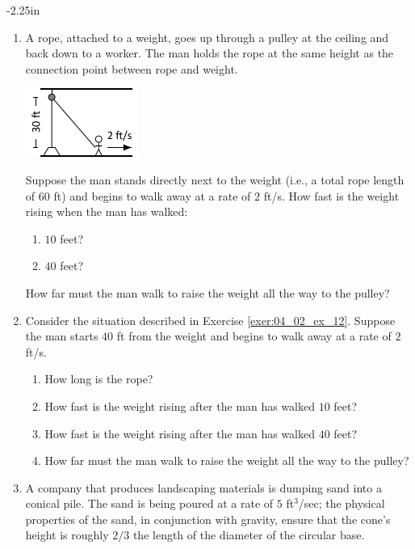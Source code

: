 \clearpage

\begin{adjustwidth*}{}{-2.25in}
\setlength{\columnsep}{25pt}
\begin{multicols*}{2}\small

\begin{enumerate}[1),start=12]

\item \label{exer:04_02_ex_12}A rope, attached to a weight, goes up through a pulley at the ceiling and back down to a worker. The man holds the rope at the same height as the connection point between rope and weight.

\includegraphics[scale=1.25]{figures/fig04_02_ex_12}

Suppose the man stands directly next to the weight (i.e., a total rope length of $60$ ft) and begins to walk away at a rate of $2$ ft/s. How fast is the weight rising when the man has walked:
\begin{enumerate}
\item	$10$ feet?
\item	$40$ feet?
\end{enumerate}
How far must the man walk to raise the weight all the way to the pulley?

\item Consider the situation described in Exercise \ref{exer:04_02_ex_12}. Suppose the man starts $40$ ft from the weight and begins to walk away at a rate of $2$ ft/s. 
\begin{enumerate}
\item	How long is the rope?
\item	How fast is the weight rising after the man has walked $10$ feet?
\item	How fast is the weight rising after the man has walked $40$ feet?
\item	How far must the man walk to raise the weight all the way to the pulley?
\end{enumerate}

\item A company that produces landscaping materials is dumping sand into a conical pile. The sand is being poured at a rate of $5$ ft$^3$/sec; the physical properties of the sand, in conjunction with gravity, ensure that the cone's height is roughly $2/3$ the length of the diameter of the circular base. 


\end{enumerate}
\end{multicols*}
\end{adjustwidth*}
